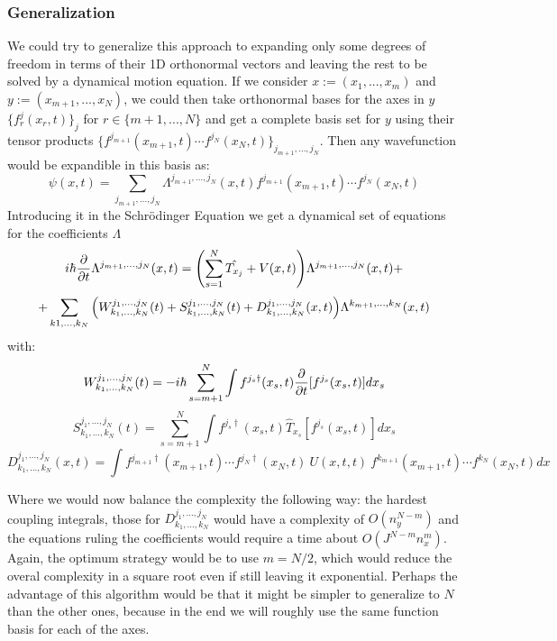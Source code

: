 \documentclass[11pt, a4paper]{article} %
\begin{document}
\subsubsection{Generalization}
We could try to generalize this approach to expanding only some degrees of freedom in terms of their 1D orthonormal vectors and leaving the rest to be solved by a dynamical motion equation. If we consider $x:=(x_1,...,x_m)$ and $y:=(x_{m+1},...,x_N)$, we could then take orthonormal bases for the axes in $y$ $\{ f^j_r(x_r,t) \}_j$ for $r\in\{m+1,...,N\}$ and get a complete basis set for $y$ using their tensor products $\{f^{j_{m+1}}(x_{m+1},t)\cdots f^{j_N}(x_N,t) \}_{j_{m+1},...,j_N}$. Then any wavefunction would be expandible in this basis as:
\begin{equation}
\psi(x,t)=\sum_{j_{m+1},...,j_N} \Lambda^{j_{m+1},...,j_N}(x,t) f^{j_{m+1}}(x_{m+1},t)\cdots f^{j_N}(x_N,t)
\end{equation}
Introducing it in the Schrödinger Equation we get a dynamical set of equations for the coefficients $\Lambda$
\begin{equation}
i\hbar \pdv{}{t} \Lambda^{j_{m+1},...,j_N}(x,t) = \qty(\sum_{s=1}^N\hat{T_{x_j}}+V(x,t) )\Lambda^{j_{m+1},...,j_N}(x,t)+
\end{equation}
$$
 +\sum_{k1,...,k_N} \qty(W^{j_1,...,j_N}_{k_1,...,k_N}(t)+S^{j_1,...,j_N}_{k_1,...,k_N}(t)+D^{j_1,...,j_N}_{k_1,...,k_N}(x,t))\Lambda^{k_{m+1},...,k_N}(x,t)
$$
with:
\begin{equation}
W^{j_1,...,j_N}_{k_1,...,k_N}(t)=-i\hbar \sum_{s=m+1}^N \int f^{j_s\dagger}(x_s,t)\pdv{}{t}[f^{j_s}(x_s,t)]dx_s
\end{equation}
\begin{equation}
S^{j_1,...,j_N}_{k_1,...,k_N}(t)=\sum_{s=m+1}^N \int f^{j_s\dagger}(x_s,t)\hat{T}_{x_s}[f^{j_s}(x_s,t)]dx_s
\end{equation}
\begin{equation}
D^{j_1,...,j_N}_{k_1,...,k_N}(x,t)=\int f^{j_{m+1}\dagger}(x_{m+1},t)\cdots f^{j_N\dagger}(x_N,t)\ U(x,t,t)\ f^{k_{m+1}}(x_{m+1},t)\cdots f^{k_N}(x_N,t) dx
\end{equation}

Where we would now balance the complexity the following way: the hardest coupling integrals, those for $D^{j_1,...,j_N}_{k_1,...,k_N}$ would have a complexity of $O(n_y^{N-m})$ and the equations ruling the coefficients would require a time about $O(J^{N-m}n_x^m)$. Again, the optimum strategy would be to use $m=N/2$, which would reduce the overal complexity in a square root even if still leaving it exponential. Perhaps the advantage of this algorithm would be that it might be simpler to generalize to $N$ than the other ones, because in the end we will roughly use the same function basis for each of the axes.
\end{document}
